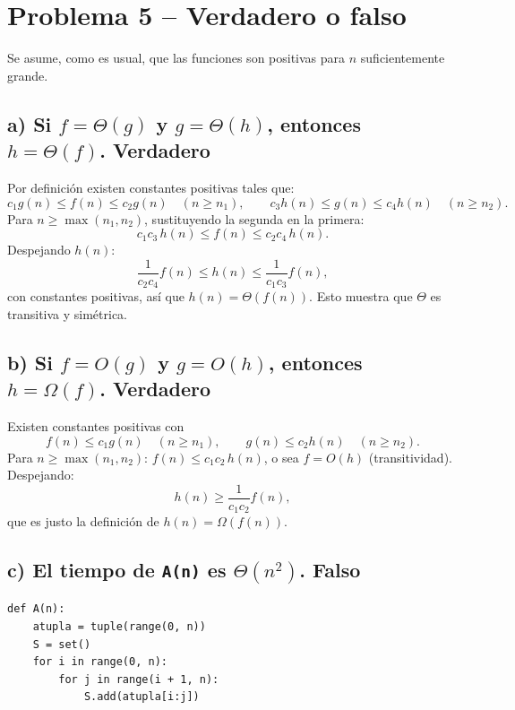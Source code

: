\documentclass[11pt]{article}
\begin{document}
\section*{Problema 5 -- Verdadero o falso}

Se asume, como es usual, que las funciones son positivas para $n$ suficientemente grande.

\subsection*{a) Si $f = \Theta(g)$ y $g = \Theta(h)$, entonces $h = \Theta(f)$. \quad \textbf{Verdadero}}

Por definición existen constantes positivas tales que:
\[
c_1 g(n) \le f(n) \le c_2 g(n) \quad (n \ge n_1), \qquad c_3 h(n) \le g(n) \le c_4 h(n) \quad (n \ge n_2).
\]
Para $n \ge \max(n_1, n_2)$, sustituyendo la segunda en la primera:
\[
c_1 c_3\, h(n) \le f(n) \le c_2 c_4\, h(n).
\]
Despejando $h(n)$:
\[
\frac{1}{c_2 c_4} f(n) \le h(n) \le \frac{1}{c_1 c_3} f(n),
\]
con constantes positivas, así que $h(n) = \Theta(f(n))$. Esto muestra que $\Theta$ es transitiva y simétrica.

\subsection*{b) Si $f = O(g)$ y $g = O(h)$, entonces $h = \Omega(f)$. \quad \textbf{Verdadero}}

Existen constantes positivas con
\[
f(n) \le c_1 g(n) \quad (n \ge n_1), \qquad g(n) \le c_2 h(n) \quad (n \ge n_2).
\]
Para $n \ge \max(n_1, n_2)$: $f(n) \le c_1 c_2\, h(n)$, o sea $f = O(h)$ (transitividad). Despejando:
\[
h(n) \ge \frac{1}{c_1 c_2} f(n),
\]
que es justo la definición de $h(n) = \Omega(f(n))$.

\subsection*{c) El tiempo de \texttt{A(n)} es $\Theta(n^2)$. \quad \textbf{Falso}}

\begin{verbatim}
def A(n):
    atupla = tuple(range(0, n))
    S = set()
    for i in range(0, n):
        for j in range(i + 1, n):
            S.add(atupla[i:j])
\end{verbatim}
\end{document}

